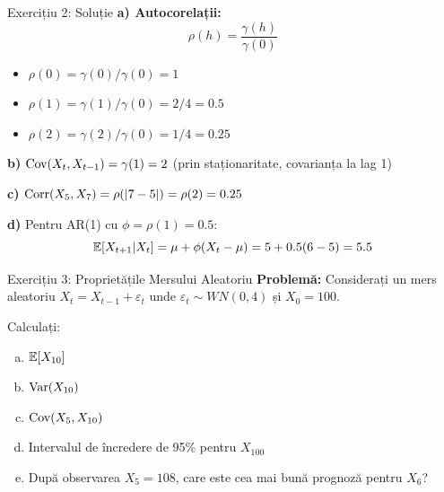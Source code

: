 \documentclass[9pt, aspectratio=169, t]{beamer}
\begin{document}
\begin{frame}{Exercițiu 2: Soluție}
    \textbf{a) Autocorelații:}
    \[
        \rho(h) = \frac{\gamma(h)}{\gamma(0)}
    \]
    \begin{itemize}
        \item $\rho(0) = \gamma(0)/\gamma(0) = 1$
        \item $\rho(1) = \gamma(1)/\gamma(0) = 2/4 = 0.5$
        \item $\rho(2) = \gamma(2)/\gamma(0) = 1/4 = 0.25$
    \end{itemize}

    \vspace{0.2cm}

    \textbf{b)} $\text{Cov}(X_t, X_{t-1}) = \gamma(1) = 2$ \quad (prin staționaritate, covarianța la lag 1)

    \vspace{0.2cm}

    \textbf{c)} $\text{Corr}(X_5, X_7) = \rho(|7-5|) = \rho(2) = 0.25$

    \vspace{0.2cm}

    \textbf{d)} Pentru AR(1) cu $\phi = \rho(1) = 0.5$:
    \[
        \mathbb{E}[X_{t+1} | X_t] = \mu + \phi(X_t - \mu) = 5 + 0.5(6-5) = 5.5
    \]
\end{frame}

\begin{frame}{Exercițiu 3: Proprietățile Mersului Aleatoriu}
    \textbf{Problemă:} Considerați un mers aleatoriu $X_t = X_{t-1} + \varepsilon_t$ unde $\varepsilon_t \sim WN(0, 4)$ și $X_0 = 100$.

    \vspace{0.4cm}

    Calculați:
    \begin{enumerate}[a)]
        \item $\mathbb{E}[X_{10}]$
        \item $\text{Var}(X_{10})$
        \item $\text{Cov}(X_5, X_{10})$
        \item Intervalul de încredere de 95\% pentru $X_{100}$
        \item După observarea $X_5 = 108$, care este cea mai bună prognoză pentru $X_6$?
    \end{enumerate}
\end{frame}
\end{document}
